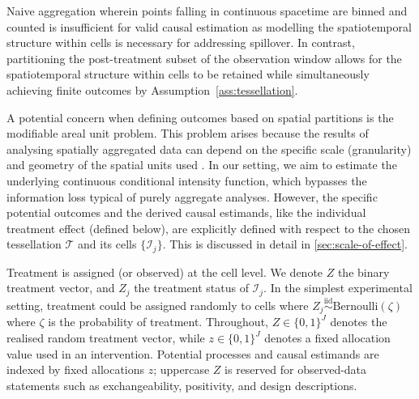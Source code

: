 \documentclass{statsoc}
\newcommand{\1}{\mathbbm{1}}
\begin{document}
Naive aggregation wherein points falling in continuous spacetime are binned and counted is insufficient for valid causal estimation as modelling the spatiotemporal structure within cells is necessary for addressing spillover. In contrast, partitioning the post-treatment subset of the observation window allows for the spatiotemporal structure within cells to be retained while simultaneously achieving finite outcomes by Assumption~\ref{ass:tessellation}.

A potential concern when defining outcomes based on spatial partitions is the modifiable areal unit problem. This problem arises because the results of analysing spatially aggregated data can depend on the specific scale (granularity) and geometry of the spatial units used \citep{fotheringham1991modifiable}. %
In our setting, we aim to estimate the underlying continuous conditional intensity function, which bypasses the information loss typical of purely aggregate analyses. However, the specific potential outcomes and the derived causal estimands, like the individual treatment effect (defined below), are explicitly defined with respect to the chosen tessellation $\mathcal{T}$ and its cells $\{\mathcal{I}_j\}$. This is discussed in detail in \cref{sec:scale-of-effect}. 

Treatment is assigned (or observed) at the cell level. We denote $Z$ the binary treatment vector, and $Z_j$ the treatment status of $\mathcal{I}_j$. In the simplest experimental setting, treatment could be assigned randomly to cells where $Z_j\overset{\text{iid}}{\sim}\text{Bernoulli}(\zeta)$ where $\zeta$ is the probability of treatment. Throughout, \(Z\in\{0,1\}^J\) denotes the realised random treatment vector, while \(z\in\{0,1\}^J\) denotes a fixed allocation value used in an intervention. Potential processes and causal estimands are indexed by fixed allocations \(z\); uppercase \(Z\) is reserved for observed-data statements such as exchangeability, positivity, and design descriptions.

\end{document}

